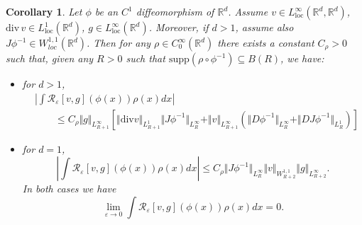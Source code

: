 \documentclass[a4paper,11pt]{article}
\newtheorem{corollary}[theorem]{Corollary}
\begin{document}
\begin{corollary}
\label{corollary commutator}Let $\phi $ be an $C^{1}$ diffeomorphism of $%
\mathbb{R}^{d}$. Assume $v\in L_{\mathrm{loc}}^{\infty }\left( \mathbb{R}%
^{d},\mathbb{R}^{d}\right) $, ${\mathrm{div}\,}v\in L_{\mathrm{loc}%
}^{1}\left( \mathbb{R}^{d}\right) $, $g\in L_{\mathrm{loc}}^{\infty
}\left( \mathbb{R}^{d}\right) $. Moreover, if $d>1$, assume also
$J\phi ^{-1}\in W_{loc}^{1,1}\left( \mathbb{R}^{d}\right) $. Then
for any $\rho \in C_{0}^{\infty }(\mathbb{R}^{d})$ there exists a
constant $C_{\rho }>0$ such that, given any $R>0$ such that
$\mathrm{supp}(\rho \circ \phi ^{-1})\subseteq B(R)$, we have:

\begin{itemize}
\item  for $d>1$,
\begin{equation*}
\begin{split}
& \left| \int \mathcal{R}_{\varepsilon }[v,g](\phi (x))\rho (x)dx\right|  \\
& \qquad \leq C_{\rho }\Vert g\Vert _{L_{R+1}^{\infty }}\left[ \Vert {\mathrm{div}}%
v\Vert _{L_{R+1}^{1}}\Vert J\phi ^{-1}\Vert _{L_{R}^{\infty }}+\Vert
v\Vert _{L_{R+1}^{\infty }}(\Vert D\phi ^{-1}\Vert _{L_{R}^{\infty
}}+\Vert DJ\phi ^{-1}\Vert _{L_{R}^{1}})\right]
\end{split}
\end{equation*}

\item  for $d=1$,
\begin{equation*}
\left| \int \mathcal{R}_{\varepsilon }[v,g](\phi (x))\rho
(x)dx\right| \leq C_{\rho }\Vert J\phi ^{-1}\Vert _{L_{R}^{\infty
}}\Vert v\Vert _{W_{R+2}^{1,1}}\Vert g\Vert _{L_{R+2}^{\infty }}.
\end{equation*}
In both cases we have
\begin{equation*}
\lim_{\varepsilon \rightarrow 0}\int \mathcal{R}_{\varepsilon }\left[ v,g%
\right] \left( \phi \left( x\right) \right) \rho \left( x\right)
dx=0.
\end{equation*}
\end{itemize}
\end{corollary}
\end{document}
